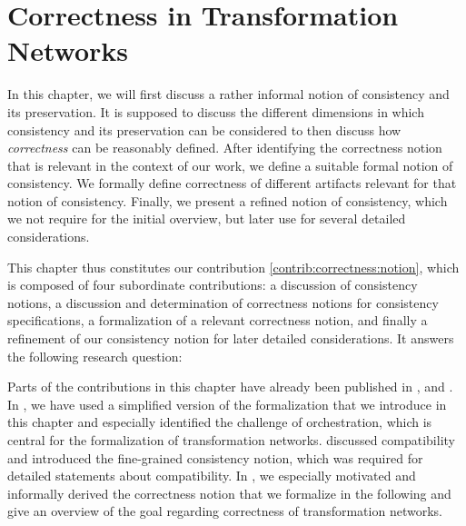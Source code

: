 \chapter{Correctness in Transformation Networks
}
\label{chap:correctness}


In this chapter, we will first discuss a rather informal notion of consistency and its preservation. It is supposed to discuss the different dimensions in which consistency and its preservation can be considered to then discuss how \emph{correctness} can be reasonably defined.
After identifying the correctness notion that is relevant in the context of our work, we define a suitable formal notion of consistency.
We formally define correctness of different artifacts relevant for that notion of consistency.
Finally, we present a refined notion of consistency, which we not require for the initial overview, but later use for several detailed considerations.

This chapter thus constitutes our contribution \autoref{contrib:correctness:notion}, which is composed of four subordinate contributions: a discussion of consistency notions, a discussion and determination of correctness notions for consistency specifications, a formalization of a relevant correctness notion, and finally a refinement of our consistency notion for later detailed considerations.
It answers the following research question:


Parts of the contributions in this chapter have already been published in ,  and .
In , we have used a simplified version of the formalization that we introduce in this chapter and especially identified the challenge of orchestration, which is central for the formalization of transformation networks.
 discussed compatibility and introduced the fine-grained consistency notion, which was required for detailed statements about compatibility.
In , we especially motivated and informally derived the correctness notion that we formalize in the following and give an overview of the goal regarding correctness of transformation networks.






